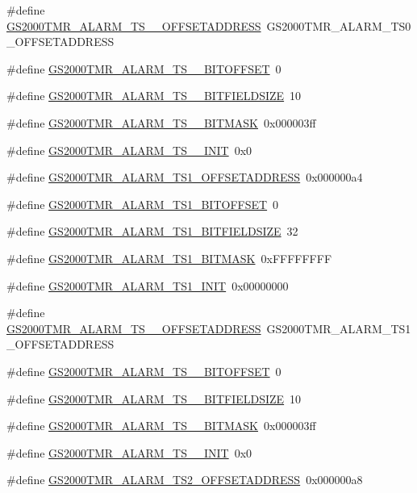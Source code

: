 \begin{DoxyCompactItemize}
\item 
\#define \hyperlink{a00556_a0939ea61828336a3076bd3f2f5311f78}{GS2000TMR\_\-ALARM\_\-TS\_\_\-OFFSETADDRESS}~GS2000TMR\_\-ALARM\_\-TS0\_\-OFFSETADDRESS
\item 
\#define \hyperlink{a00556_a9386662e405ef4a04a8f2f7be10204e4}{GS2000TMR\_\-ALARM\_\-TS\_\_\-BITOFFSET}~0
\item 
\#define \hyperlink{a00556_a8a4450093350814e4378a20f7310971e}{GS2000TMR\_\-ALARM\_\-TS\_\_\-BITFIELDSIZE}~10
\item 
\#define \hyperlink{a00556_a238e4d002aa7550f782528b3abaf579a}{GS2000TMR\_\-ALARM\_\-TS\_\_\-BITMASK}~0x000003ff
\item 
\#define \hyperlink{a00556_a4eee327f0d6aa3fb8660b77805dc8ada}{GS2000TMR\_\-ALARM\_\-TS\_\_\-INIT}~0x0
\item 
\#define \hyperlink{a00556_af7647882ab1cfade797d94bf27013d6e}{GS2000TMR\_\-ALARM\_\-TS1\_\-OFFSETADDRESS}~0x000000a4
\item 
\#define \hyperlink{a00556_aea42d1e72b8ded3453341db73c5b1b26}{GS2000TMR\_\-ALARM\_\-TS1\_\-BITOFFSET}~0
\item 
\#define \hyperlink{a00556_a062b195b04907dd57662842e0d309f34}{GS2000TMR\_\-ALARM\_\-TS1\_\-BITFIELDSIZE}~32
\item 
\#define \hyperlink{a00556_a8b3b0387a79f982395a1b2e6c8c1a2d1}{GS2000TMR\_\-ALARM\_\-TS1\_\-BITMASK}~0xFFFFFFFF
\item 
\#define \hyperlink{a00556_ada171bebeed6348d5b40f12615d2e86a}{GS2000TMR\_\-ALARM\_\-TS1\_\-INIT}~0x00000000
\item 
\#define \hyperlink{a00556_a98dee2ed8255e206af07ea7d02733b07}{GS2000TMR\_\-ALARM\_\-TS\_\_\-OFFSETADDRESS}~GS2000TMR\_\-ALARM\_\-TS1\_\-OFFSETADDRESS
\item 
\#define \hyperlink{a00556_a2adfeac7058abc657f691755b167b21e}{GS2000TMR\_\-ALARM\_\-TS\_\_\-BITOFFSET}~0
\item 
\#define \hyperlink{a00556_ac4c9a0de233c39e5b709ea3d7e7278e5}{GS2000TMR\_\-ALARM\_\-TS\_\_\-BITFIELDSIZE}~10
\item 
\#define \hyperlink{a00556_a1a4546525a1089dae304177f09766945}{GS2000TMR\_\-ALARM\_\-TS\_\_\-BITMASK}~0x000003ff
\item 
\#define \hyperlink{a00556_a0bf075bca85ae88b7a7bacb7e5b24e21}{GS2000TMR\_\-ALARM\_\-TS\_\_\-INIT}~0x0
\item 
\#define \hyperlink{a00556_a0ee3064c2e40d911aec43de7c433817a}{GS2000TMR\_\-ALARM\_\-TS2\_\-OFFSETADDRESS}~0x000000a8

\end{DoxyCompactItemize}
